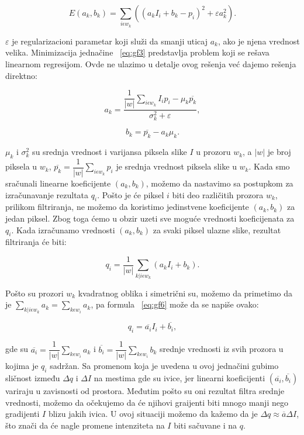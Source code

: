 \documentclass[a4paper,12pt,titlepage]{article}
\begin{document}
\begin{equation}\label{eq:gf3}
	E(a_k, b_k) = \sum_{i \epsilon w_k} ((a_kI_i + b_k - p_i)^2 + \varepsilon a_k^2).
\end{equation}

$\varepsilon$ je regularizacioni parametar koji služi da smanji uticaj $a_k$, ako je njena vrednost velika. Minimizacija jednačine ~\ref{eq:gf3}  predstavlja problem koji se rešava linearnom regresijom. Ovde ne ulazimo u detalje ovog rešenja već dajemo rešenja direktno:

\begin{equation}\label{eq:gf4}
	a_k = \dfrac{\dfrac{1}{|w|} \sum_{i \epsilon w_k} I_ip_i - \mu_k \overline{p_k}}{\sigma_k^2 + \varepsilon},
\end{equation}

\begin{equation}\label{eq:gf5}
	b_k = \overline{p_k} - a_k \mu_k.
\end{equation}

$\mu_k$ i $\sigma_k^2$ su srednja vrednost i varijansa piksela slike $I$ u prozoru $w_k$, a $|w|$ je broj piksela u $w_k$, $\overline{p_k} = \dfrac{1}{|w|} \sum_{i \epsilon w_k} p_i$ je srednja vrednost piksela slike u $w_k$. Kada smo sračunali linearne koeficijente $(a_k, b_k)$, možemo da nastavimo sa postupkom za izračunavanje rezultata $q_i$. Pošto je će piksel $i$ biti deo različitih prozora $w_k$, prilikom filtriranja, ne možemo da koristimo jedinstvene koeficijente $(a_k, b_k)$ za jedan piksel. Zbog toga ćemo u obzir uzeti sve moguće vrednosti koeficijenata za $q_i$. Kada izračunamo vrednosti $(a_k, b_k)$ za svaki piksel ulazne slike, rezultat filtriranja će biti:

\begin{equation}\label{eq:gf6}
	q_i = \dfrac{1}{|w|} \sum_{k|i \epsilon w_k} (a_kI_i + b_k).
\end{equation}    

Pošto su prozori $w_k$ kvadratnog oblika i simetrični su, možemo da primetimo da je $\sum_{k|i \epsilon w_k} a_k = \sum_{k \epsilon w_i} a_k$, pa formula ~\ref{eq:gf6} može da se napiše ovako:

\begin{equation}\label{eq:gf7}
	q_i = \overline{a_i}I_i + \overline{b_i},
\end{equation}

gde su $\overline{a_i} = \dfrac{1}{|w|}\sum_{k \epsilon w_i} a_k$ i $\overline{b_i} = \dfrac{1}{|w|}\sum_{k \epsilon w_i} b_k$ srednje vrednosti iz svih prozora u kojima je $q_i$ sadržan. Sa promenom koja je uvedena u ovoj jednačini gubimo sličnost između $\Delta q$ i $\Delta I$ na mestima gde su ivice, jer linearni koeficijenti $(\overline{a_i}, \overline{b_i})$ variraju u zavisnosti od prostora. Međutim pošto su oni rezultat filtra srednje vrednosti, možemo da očekujemo da će njihovi graijenti biti mnogo manji nego gradijenti $I$ blizu jakih ivica. U ovoj situaciji možemo da kažemo da je $\Delta q \approx \overline{a} \Delta I$, što znači da će nagle promene intenziteta na $I$ biti sačuvane i na $q$. 
\end{document}
